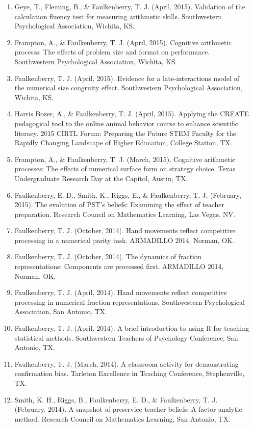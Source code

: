 \documentclass[article,10pt]{article}
\begin{document}
\begin{enumerate}
\item Geye, T., Fleming, B., \& Faulkenberry, T. J. (April, 2015). Validation of the calculation fluency test for measuring arithmetic skills. Southwestern Psychological Association, Wichita, KS.
\item Frampton, A., \& Faulkenberry, T. J. (April, 2015). Cognitive arithmetic processs: The effects of problem size and format on performance. Southwestern Psychological Association, Wichita, KS.
\item Faulkenberry, T. J. (April, 2015). Evidence for a late-interactions model of the numerical size congruity effect. Southwestern Psychological Association, Wichita, KS.
\item Harris Bozer, A., \& Faulkenberry, T. J. (April, 2015). Applying the CREATE pedagogical tool to the online animal behavior course to enhance scientific literacy.  2015 CIRTL Forum: Preparing the Future STEM Faculty for the Rapidly Changing Landscape of Higher Education, College Station, TX.
\item Frampton, A., \& Faulkenberry, T. J. (March, 2015). Cognitive arithmetic processes: The effects of numerical surface form on strategy choice. Texas Undergraduate Research Day at the Capitol, Austin, TX.
\item Faulkenberry, E. D., Smith, K., Riggs, E., \& Faulkenberry, T. J. (February, 2015). The evolution of PST’s beliefs: Examining the effect of teacher preparation. Research Council on Mathematics Learning, Las Vegas, NV.
\item Faulkenberry, T. J. (October, 2014).  Hand movements reflect competitive processing in a numerical parity task. ARMADILLO 2014, Norman, OK.
\item Faulkenberry, T. J. (October, 2014). The dynamics of fraction representations: Components are processed first. ARMADILLO 2014, Norman, OK.
\item Faulkenberry, T. J. (April, 2014). Hand movements reflect competitive processing in numerical fraction representations. Southwestern Psychological Association, San Antonio, TX.
\item Faulkenberry, T. J. (April, 2014). A brief introduction to using R for teaching statistical methods. Southwestern Teachers of Psychology Conference, San Antonio, TX.
\item Faulkenberry, T. J. (March, 2014). A classroom activity for demonstrating confirmation bias. Tarleton Excellence in Teaching Conference, Stephenville, TX.
\item Smith, K. H., Riggs, B., Faulkenberry, E. D., \& Faulkenberry, T. J. (February, 2014). A snapshot of preservice teacher beliefs: A factor analytic method. Research Council on Mathematics Learning, San Antonio, TX.

\end{enumerate}
\end{document}
